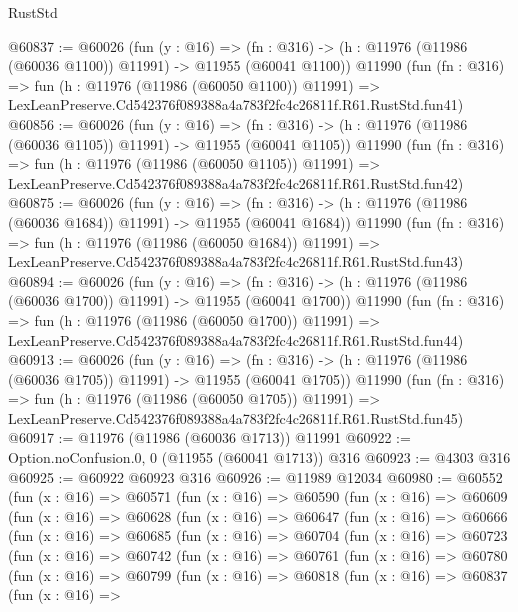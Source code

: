 \begin{lexlean}{RustStd}
\begin{coremodule}
@60837 := @60026
    (fun (y : @16) =>
    (fn : @316) -> (h : @11976 (@11986 (@60036 @1100)) @11991) -> @11955 (@60041 @1100))
    @11990
    (fun (fn : @316) =>
    fun (h : @11976 (@11986 (@60050 @1100)) @11991) =>
    LexLeanPreserve.Cd542376f089388a4a783f2fc4c26811f.R61.RustStd.fun41)
@60856 := @60026
    (fun (y : @16) =>
    (fn : @316) -> (h : @11976 (@11986 (@60036 @1105)) @11991) -> @11955 (@60041 @1105))
    @11990
    (fun (fn : @316) =>
    fun (h : @11976 (@11986 (@60050 @1105)) @11991) =>
    LexLeanPreserve.Cd542376f089388a4a783f2fc4c26811f.R61.RustStd.fun42)
@60875 := @60026
    (fun (y : @16) =>
    (fn : @316) -> (h : @11976 (@11986 (@60036 @1684)) @11991) -> @11955 (@60041 @1684))
    @11990
    (fun (fn : @316) =>
    fun (h : @11976 (@11986 (@60050 @1684)) @11991) =>
    LexLeanPreserve.Cd542376f089388a4a783f2fc4c26811f.R61.RustStd.fun43)
@60894 := @60026
    (fun (y : @16) =>
    (fn : @316) -> (h : @11976 (@11986 (@60036 @1700)) @11991) -> @11955 (@60041 @1700))
    @11990
    (fun (fn : @316) =>
    fun (h : @11976 (@11986 (@60050 @1700)) @11991) =>
    LexLeanPreserve.Cd542376f089388a4a783f2fc4c26811f.R61.RustStd.fun44)
@60913 := @60026
    (fun (y : @16) =>
    (fn : @316) -> (h : @11976 (@11986 (@60036 @1705)) @11991) -> @11955 (@60041 @1705))
    @11990
    (fun (fn : @316) =>
    fun (h : @11976 (@11986 (@60050 @1705)) @11991) =>
    LexLeanPreserve.Cd542376f089388a4a783f2fc4c26811f.R61.RustStd.fun45)
@60917 := @11976 (@11986 (@60036 @1713)) @11991
@60922 := Option.noConfusion.{0, 0} (@11955 (@60041 @1713)) @316
@60923 := @4303 @316
@60925 := @60922 @60923 @316
@60926 := @11989 @12034
@60980 := @60552
    (fun (x : @16) =>
    @60571
      (fun (x : @16) =>
      @60590
        (fun (x : @16) =>
        @60609
          (fun (x : @16) =>
          @60628
            (fun (x : @16) =>
            @60647
              (fun (x : @16) =>
              @60666
                (fun (x : @16) =>
                @60685
                  (fun (x : @16) =>
                  @60704
                    (fun (x : @16) =>
                    @60723
                      (fun (x : @16) =>
                      @60742
                        (fun (x : @16) =>
                        @60761
                          (fun (x : @16) =>
                          @60780
                            (fun (x : @16) =>
                            @60799
                              (fun (x : @16) =>
                              @60818
                                (fun (x : @16) =>
                                @60837
                                  (fun (x : @16) =>

\end{coremodule}
\end{lexlean}
